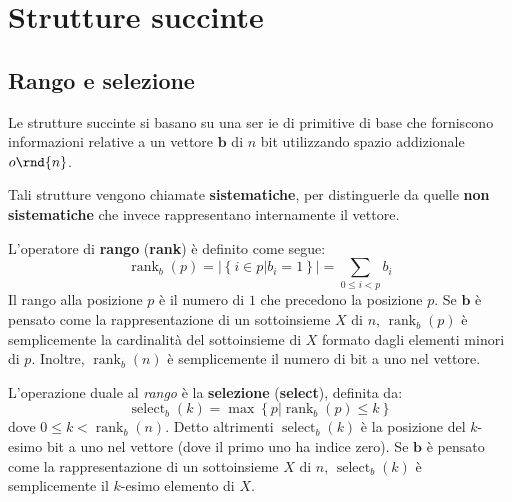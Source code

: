 \documentclass[\main/main.tex]{subfiles}
\begin{document}
\chapter{Strutture succinte}
\section{Rango e selezione}
\begin{definition}
    Le strutture succinte si basano su una ser
    ie di primitive di base che forniscono informazioni relative a un vettore \(\bm{b}\) di \(n\) bit utilizzando spazio addizionale \(o\rnd{n}\).
    
    Tali strutture vengono chiamate \textbf{sistematiche}, per distinguerle da quelle \textbf{non sistematiche} che invece rappresentano internamente il vettore.
\end{definition}
\begin{definition}[Rango]
    L'operatore di \textbf{rango} (\textbf{rank}) è definito come segue:
    \[
        \operatorname{rank}_{b}(p)=\left|\left\{i \in p | b_{i}=1\right\}\right|=\sum_{0 \leq i<p} b_{i}
    \]
    Il rango alla posizione \(p\) è il numero di \(1\) che precedono la posizione \(p\). Se \(\bm{b}\) è pensato come la rappresentazione di un sottoinsieme \(X\) di \(n\), \(\operatorname{rank}_{b}(p)\) è semplicemente la cardinalità del sottoinsieme di \(X\) formato dagli elementi minori di \(p\). Inoltre, \(\operatorname{rank}_{b}(n)\) è semplicemente il numero di bit a uno nel vettore.
\end{definition}
\begin{definition}[Selezione]
    L'operazione duale al \textit{rango} è la \textbf{selezione} (\textbf{select}), definita da:
    \[
        \operatorname{select}_{b}(k)=\max \left\{p | \operatorname{rank}_{b}(p) \leq k\right\}
    \]
    dove \(0 \leq k<\operatorname{rank}_{b}(n)\). Detto altrimenti \(\operatorname{select}_{b}(k)\) è la posizione del \(k\)-esimo bit a uno nel vettore (dove il primo uno ha indice zero). Se \(\bm{b}\) è pensato come la rappresentazione di un sottoinsieme \(X\) di \(n\), \(\operatorname{select}_{b}(k)\) è semplicemente il \(k\)-esimo elemento di \(X\).
\end{definition}
\end{document}
